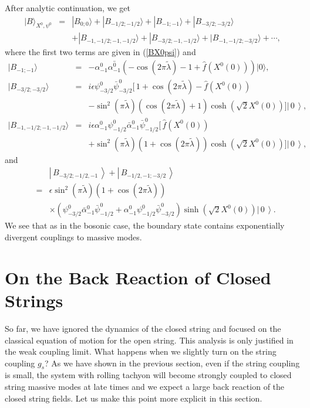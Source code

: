 \documentclass[a4paper,12pt]{article} \textheight=8.5truein
\newcommand{\ket}[1]{\left|\, #1\,\right\rangle}
\newcommand{\tlambda}{\tilde{\lambda}}
\begin{document}
After analytic continuation, we get
\begin{eqnarray*}
|B\rangle_{X^0,\psi^0}&=&|B_{0;0}\rangle+|B_{-1/2;-1/2}\rangle
+|B_{-1;-1}\rangle+|B_{-3/2;-3/2}\rangle \\
&& +|B_{-1,-1/2;-1,-1/2}\rangle +|B_{-3/2;-1,-1/2}\rangle
+|B_{-1,-1/2;-3/2}\rangle + \cdots,
\end{eqnarray*}
where the first two terms are given in (\ref{BX0psi}) and
\begin{eqnarray}
|B_{-1;-1}\rangle&=& -\alpha^0_{-1}\bar{\alpha^0_{-1}}
(-\cos(2\pi\tilde{\lambda})-1+\hat f(X^0(0)))|0\rangle, \\
|B_{-3/2;-3/2}\rangle &=&
i\epsilon\psi_{-3/2}^0\bar{\psi}_{-3/2}^0[\, 1+\cos(2\pi\tlambda)
-\hat f(X^0(0))\nonumber \\
&&-\sin^2(\pi\tlambda) (\cos (2\pi\tlambda)+1) \cosh(\sqrt{2}X^0(0))]
\ket{0},\\
|B_{-1,-1/2;-1,-1/2}\rangle &=&
i\epsilon\alpha_{-1}^0\psi_{-1/2}^0 \bar{\alpha}_{-1}^0
\bar{\psi}_{-1/2}^0 [\,\hat f(X^0(0))\nonumber\\
&&+ \sin^2 (\pi\tlambda)(1+\cos(2\pi\tlambda))\cosh(\sqrt{2}X^0(0))
 ]\ket{0},
\end{eqnarray}
and
\begin{eqnarray}
&&\ket{B_{-3/2;-1/2,-1}}+\ket{B_{-1/2,-1;-3/2}}\nonumber\\
&=&
\epsilon\sin^2(\pi\tlambda)(1+\cos(2\pi\tlambda))\nonumber\\
&&\times\left( \psi_{-3/2}^0\bar{\alpha}_{-1}^0\bar{\psi}_{-1/2}^0
+\alpha_{-1}^0\psi_{-1/2}^0\bar{\psi}_{-3/2}^0
\right)\sinh(\sqrt{2} X^0(0))\ket{0}.
\end{eqnarray}
We see that as in the bosonic case, the boundary state contains
exponentially divergent couplings to massive modes.
\section{On the Back Reaction of Closed Strings} \label{estimate}

So far, we have ignored the dynamics of the closed string and
focused on the classical equation of motion for the open string.
This analysis is only justified in the weak coupling limit. What
happens when we slightly turn on the string coupling $g_s$? As we
have shown in the previous section, even if the string coupling is
small, the system with rolling tachyon will become strongly
coupled to closed string massive modes at late times and we expect
a large back reaction of the closed string fields. Let us make
this point more explicit in this section.
\end{document}
